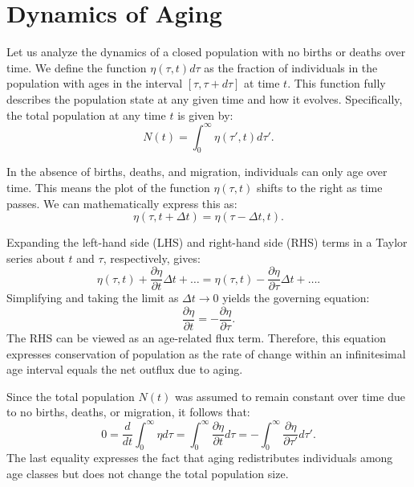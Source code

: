 \section{Dynamics of Aging}

Let us analyze the dynamics of a closed population with no births or deaths over time. We define the function $\eta(\tau, t) d\tau$ as the fraction of individuals in the population with ages in the interval $[\tau, \tau+d\tau]$ at time $t$. This function fully describes the population state at any given time and how it evolves. Specifically, the total population at any time $t$ is given by:
\begin{equation*}
N(t) = \int_0^\infty \eta(\tau', t) d\tau'.
\end{equation*}

In the absence of births, deaths, and migration, individuals can only age over time. This means the plot of the function $\eta(\tau, t)$ shifts to the right as time passes. We can mathematically express this as:
\begin{equation*}
\eta(\tau, t+\Delta t) = \eta(\tau-\Delta t, t).
\end{equation*}

Expanding the left-hand side (LHS) and right-hand side (RHS) terms in a Taylor series about $t$ and $\tau$, respectively, gives:
\begin{equation*}
\eta(\tau, t) + \frac{\partial \eta}{\partial t} \Delta t + \dots = \eta(\tau, t) - \frac{\partial \eta}{\partial \tau} \Delta t + \dots.
\end{equation*}
Simplifying and taking the limit as $\Delta t \to 0$ yields the governing equation:
\begin{equation}
\frac{\partial \eta}{\partial t} = -\frac{\partial \eta}{\partial \tau}. \label{eq:04.01}
\end{equation}
The RHS can be viewed as an age-related flux term. Therefore, this equation expresses conservation of population as the rate of change within an infinitesimal age interval equals the net outflux due to aging.

Since the total population $N(t)$ was assumed to remain constant over time due to no births, deaths, or migration, it follows that:
\begin{equation*}
0 = \frac{d}{d t}\int_0^\infty \eta d\tau =\int_0^\infty \frac{\partial \eta}{\partial t} d\tau =  - \int_0^\infty \frac{\partial \eta}{\partial \tau'} d\tau'.
\end{equation*}
The last equality expresses the fact that aging redistributes individuals among age classes but does not change the total population size.

